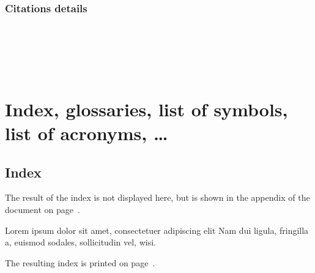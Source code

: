 \begin{filecontents*}{\democodefile}
\cite{companion,augustine,bertram,cotton,hammond,massa,murray}
\end{filecontents*}

%

\subsubsection{Citations details}

\begin{filecontents*}{\democodefile}
\cite{companion} \\
 \\
\citeyear{companion} \\
\citeauthor{companion} \\
\end{filecontents*}

%



\clearpage
\section{Index, glossaries, list of symbols, list of acronyms, \ldots}

\subsection{Index}

The result of the index is not displayed here, but is shown in the appendix of the document on page~\pageref{sec:Index}.


\begin{filecontents*}{\democodefile}
Lorem ipsum 
dolor sit amet, consectetuer adipiscing 
elit Nam dui ligula, fringilla a, euismod sodales, 
sollicitudin vel, wisi.

The resulting index is printed on page~\pageref{sec:Index}.
\end{filecontents*}

